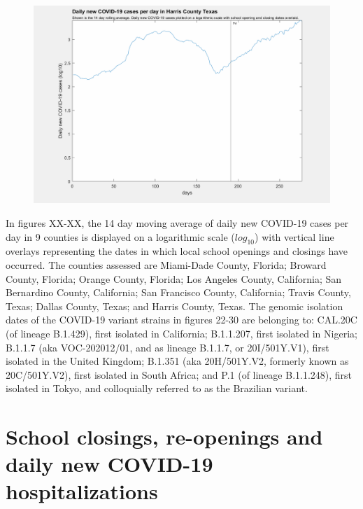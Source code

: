 \documentclass[]{article}
\begin{document}
\begin{figure}[!h]
	\includegraphics[width=\linewidth]{images/harris_cases_school_log.png}
	\caption{}
	\label{fig:images/harris_cases_school_logLabel}
\end{figure}


\FloatBarrier

In figures XX-XX, the 14 day moving average of daily new COVID-19 cases per day in 9 counties is displayed on a logarithmic scale ($log_{10}$) with vertical line overlays representing the dates in which local school openings and closings have occurred. The counties assessed are Miami-Dade County, Florida; Broward County, Florida; Orange County, Florida; Los Angeles County, California; San Bernardino County, California; San Francisco County, California; Travis County, Texas; Dallas County, Texas; and Harris County, Texas. The genomic isolation dates of the COVID-19 variant strains in figures 22-30 are belonging to: CAL.20C (of lineage B.1.429), first isolated in California; B.1.1.207, first isolated in Nigeria; B.1.1.7 (aka VOC-202012/01, and as lineage B.1.1.7, or 20I/501Y.V1), first isolated in the United Kingdom; B.1.351 (aka 20H/501Y.V2, formerly known as 20C/501Y.V2), first isolated in South Africa; and P.1 (of lineage B.1.1.248), first isolated in Tokyo, and colloquially referred to as the Brazilian variant.



\FloatBarrier
\vspace{5mm}
\section*{School closings, re-openings and daily new COVID-19 hospitalizations }
\end{document}
